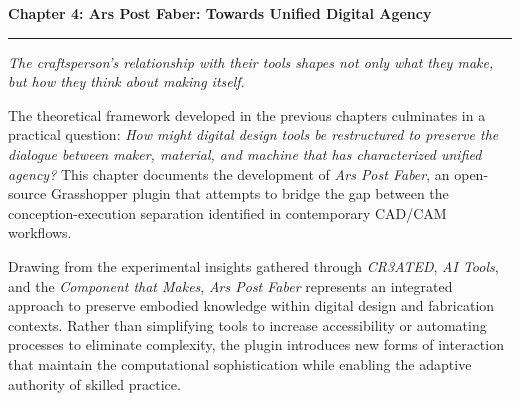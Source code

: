 \clearpage


\setcounter{chapter}{4}
\setcounter{section}{0}


\pagestyle{fancy}
\fancyhf{} %
\fancyfoot[C]{\thepage} %
\renewcommand{\headrulewidth}{0pt}
\renewcommand{\footrulewidth}{0pt}

\noindent
{\Large\textbf{Chapter 4: Ars Post Faber: Towards Unified Digital Agency}}
\vspace{0.3cm}
\hrule
\vspace{0.8cm}
\label{ch:ArsPostFaber}

\setlength{\parindent}{0pt}

\textit{The craftsperson's relationship with their tools shapes not only what they make, but how they think about making itself.}

\vspace{0.5cm}

The theoretical framework developed in the previous chapters culminates in a practical question: \textit{How might digital design tools be restructured to preserve the dialogue between maker, material, and machine that has characterized unified agency?} This chapter documents the development of \textit{Ars Post Faber}, an open-source Grasshopper plugin that attempts to bridge the gap between the conception-execution separation identified in contemporary CAD/CAM workflows.

\vspace{0.5cm}

Drawing from the experimental insights gathered through \textit{CR3ATED}, \textit{AI Tools}, and the \textit{Component that Makes}, \textit{Ars Post Faber} represents an integrated approach to preserve embodied knowledge within digital design and fabrication contexts. Rather than simplifying tools to increase accessibility or automating processes to eliminate complexity, the plugin introduces new forms of interaction that maintain the computational sophistication while enabling the adaptive authority of skilled practice.

